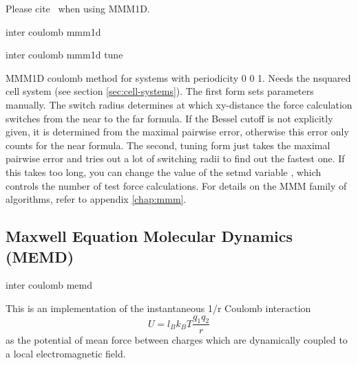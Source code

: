 \begin{citebox}
  Please cite~ when using MMM1D.
\end{citebox}

\begin{essyntax}
  inter coulomb  mmm1d 
   

  inter coulomb  mmm1d tune 
  \begin{features}
  \end{features}
\end{essyntax}
MMM1D coulomb method for systems with periodicity 0 0 1. Needs the
nsquared cell system (see section \vref{sec:cell-systems}). The first
form sets parameters manually. The switch radius determines at which
xy-distance the force calculation switches from the near to the far
formula. If the Bessel cutoff is not explicitly given, it is
determined from the maximal pairwise error, otherwise this error only
counts for the near formula. The second, tuning form just takes the
maximal pairwise error and tries out a lot of switching radii to find
out the fastest one. If this takes too long, you can change the value
of the setmd variable , which controls the number of
test force calculations. For details on the MMM family of algorithms,
refer to appendix \vref{chap:mmm}.

\subsection{Maxwell Equation Molecular Dynamics (MEMD)}

\begin{essyntax}
  inter coulomb 
  memd   
  \begin{features}
  \end{features}
\end{essyntax}

This is an implementation of the instantaneous 1/r Coulomb interaction
\begin{equation}
  U = l_B k_B T \frac{q_1 q_2}{r}
\end{equation}
as the potential of mean force between charges which are dynamically
coupled to a local electromagnetic field.

